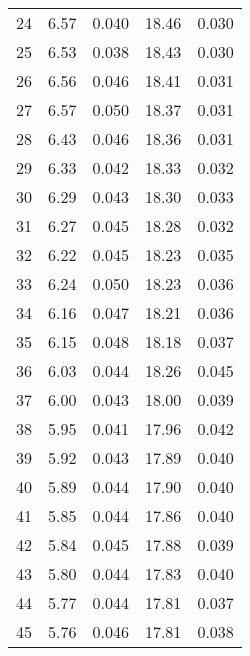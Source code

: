 \begin{table}
\begin{tabular}{c|ll|ll}
24 & 6.57 & 0.040 & 18.46 & 0.030 \\
25 & 6.53 & 0.038 & 18.43 & 0.030 \\
26 & 6.56 & 0.046 & 18.41 & 0.031 \\
27 & 6.57 & 0.050 & 18.37 & 0.031 \\
28 & 6.43 & 0.046 & 18.36 & 0.031 \\
29 & 6.33 & 0.042 & 18.33 & 0.032 \\
30 & 6.29 & 0.043 & 18.30 & 0.033 \\
31 & 6.27 & 0.045 & 18.28 & 0.032 \\
32 & 6.22 & 0.045 & 18.23 & 0.035 \\
33 & 6.24 & 0.050 & 18.23 & 0.036 \\
34 & 6.16 & 0.047 & 18.21 & 0.036 \\
35 & 6.15 & 0.048 & 18.18 & 0.037 \\
36 & 6.03 & 0.044 & 18.26 & 0.045 \\
37 & 6.00 & 0.043 & 18.00 & 0.039 \\
38 & 5.95 & 0.041 & 17.96 & 0.042 \\
39 & 5.92 & 0.043 & 17.89 & 0.040 \\
40 & 5.89 & 0.044 & 17.90 & 0.040 \\
41 & 5.85 & 0.044 & 17.86 & 0.040 \\
42 & 5.84 & 0.045 & 17.88 & 0.039 \\
43 & 5.80 & 0.044 & 17.83 & 0.040 \\
44 & 5.77 & 0.044 & 17.81 & 0.037 \\
45 & 5.76 & 0.046 & 17.81 & 0.038 \\
               \hline
        \end{tabular}
    \end{table}
    \clearpage

